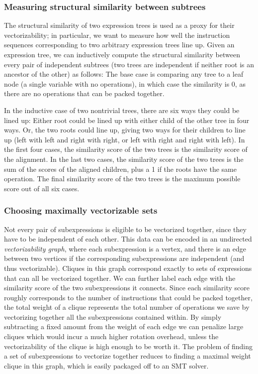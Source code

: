\subsubsection*{Measuring structural similarity between subtrees}
The structural similarity of two expression trees is used as a proxy for their vectorizability; in particular, we want to measure how well the instruction sequences corresponding to two arbitrary expression trees line up.
Given an expression tree, we can inductively compute the structural similarity between every pair of independent subtrees (two trees are independent if neither root is an ancestor of the other) as follows:
The base case is comparing any tree to a leaf node (a single variable with no operations), in which case the similarity is $0$, as there are no operations that can be packed together.

In the inductive case of two nontrivial trees, there are six ways they could be lined up: 
Either root could be lined up with either child of the other tree in four ways. 
Or, the two roots could line up, giving two ways for their children to line up (left with left and right with right, or left with right and right with left).
In the first four cases, the similarity score of the two trees is the similarity score of the alignment. 
In the last two cases, the similarity score of the two trees is the sum of the scores of the aligned children, plus a 1 if the roots have the same operation.
The final similarity score of the two trees is the maximum possible score out of all six cases. 
\subsubsection*{Choosing maximally vectorizable sets}
Not every pair of subexpressions is eligible to be vectorized together, since they have to be independent of each other.
This data can be encoded in an undirected {\em vectorizability graph}, where each subexpression is a vertex, and there is an edge between two vertices if the corresponding subexpressions are independent (and thus vectorizable).
Cliques in this graph correspond exactly to sets of expressions that can all be vectorized together. 
We can further label each edge with the similarity score of the two subexpressions it connects.
Since each similarity score roughly corresponds to the number of instructions that could be packed together, the total weight of a clique represents the total number of operations we save by vectorizing together all the subexpressions contained within. 
By simply subtracting a fixed amount from the weight of each edge we can penalize large cliques which would incur a much higher rotation overhead, unless the vectorizability of the clique is high enough to be worth it.
The problem of finding a set of subexpressions to vectorize together reduces to finding a maximal weight clique in this graph, which is easily packaged off to an SMT solver.

